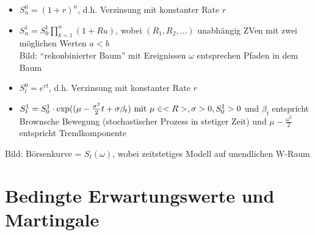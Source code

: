 \begin{*example}
	\begin{itemize}
		\item $S^0_n = (1+r)^n$, d.h. Verzinsung mit konstanter Rate $r$
		\item $S^1_n = S_0^1 \prod_{k=1}^n(1+Ru)$, wobei $(R_1, R_2, \dots)$ unabhängig ZVen mit zwei möglichen Werten $a < b$\\
		Bild: ``rekonbinierter Baum'' mit Ereignissen $\omega$ entsprechen Pfaden in dem Baum
	\end{itemize}
\end{*example}
\begin{*example}
	\begin{itemize}
		\item $S^0_t = e^{rt}$, d.h. Verzinsung mit konstanter Rate $r$
		\item $S_t^1 = S_0^1\cdot \exp((\mu - \frac{\sigma^2}{2}t + \sigma\beta_t) \text{ mit } \mu \in <R>, \sigma > 0, S^1_0 >0$ und $\beta_t$ entspricht Brownsche Bewegung (stochastischer Prozess in stetiger Zeit) und $\mu - \frac{\omega^2}{2}$ entspricht Trendkomponente
	\end{itemize}
	Bild: Börsenkurve = $S_t(\omega)$, wobei zeitstetiges Modell auf unendlichen W-Raum
\end{*example}
\section{Bedingte Erwartungswerte und Martingale} %
